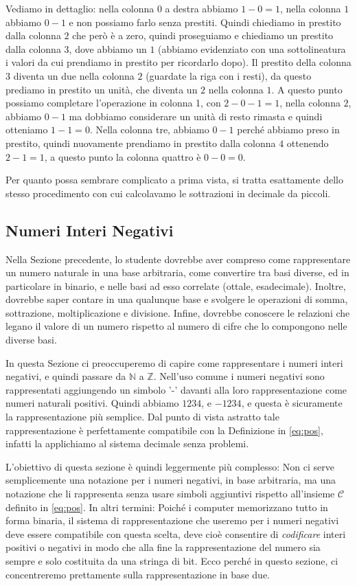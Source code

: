 \documentclass[a4paper]{book}
\theoremstyle{definition}
\begin{document}
Vediamo in dettaglio: nella colonna $0$ a destra abbiamo $1-0 = 1$,
nella colonna $1$ abbiamo $0-1$ e non possiamo farlo senza prestiti. 
Quindi chiediamo in prestito dalla colonna $2$ che però è a zero, quindi proseguiamo e chiediamo un prestito dalla colonna $3$, dove abbiamo un $1$ (abbiamo evidenziato con una sottolineatura i valori da cui prendiamo in prestito per ricordarlo dopo).
Il prestito della colonna $3$ diventa un due nella colonna $2$ (guardate la riga con i resti), da questo prediamo in prestito un unità, che diventa un $2$ nella colonna $1$.
A questo punto possiamo completare l'operazione in colonna 1, con $2-0-1 = 1$,
nella colonna $2$, abbiamo $0 - 1$ ma dobbiamo considerare un unità di resto rimasta e quindi otteniamo $1 - 1 = 0$. Nella colonna tre, abbiamo $0-1$ perché abbiamo preso in prestito, quindi nuovamente prendiamo in prestito dalla colonna $4$ ottenendo $2-1 = 1$, a questo punto la colonna quattro è $0-0=0$.

Per quanto possa sembrare complicato a prima vista, si tratta esattamente
dello stesso procedimento con cui calcolavamo le sottrazioni in decimale da piccoli.


\subsection{Numeri Interi Negativi}

Nella Sezione precedente, lo studente dovrebbe aver compreso come rappresentare
un numero naturale in una base arbitraria, come convertire tra basi diverse, ed
in particolare in binario, e nelle basi ad esso correlate (ottale,
esadecimale). Inoltre, dovrebbe saper contare in una qualunque base e svolgere
le operazioni di somma, sottrazione, moltiplicazione e divisione. Infine,
dovrebbe conoscere le relazioni che legano il valore di un numero rispetto al
numero di cifre che lo compongono nelle diverse basi.

In questa Sezione ci preoccuperemo di capire come rappresentare i numeri interi negativi, e quindi passare da $\mathbb{N}$ a $\mathbb{Z}$. Nell'uso comune i numeri negativi sono rappresentati aggiungendo un simbolo '-' davanti alla loro rappresentazione come numeri naturali positivi. Quindi abbiamo $1234$, e $-1234$, e questa è sicuramente la rappresentazione più semplice. Dal punto di vista astratto tale rappresentazione è perfettamente compatibile con la Definizione in \eqref{eq:pos}, infatti la applichiamo al sistema decimale senza problemi.

L'obiettivo di questa sezione è quindi leggermente più complesso: Non ci serve semplicemente una notazione per i numeri negativi, in base arbitraria, ma una notazione che li rappresenta senza usare simboli aggiuntivi rispetto all'insieme $\mathcal{C}$ definito in \eqref{eq:pos}. In altri termini: Poiché i computer memorizzano tutto in forma binaria, il sistema di rappresentazione che useremo per i numeri negativi deve essere compatibile con questa scelta, deve cioè consentire di \emph{codificare} interi positivi o negativi in modo che alla fine la rappresentazione del numero sia sempre e solo costituita da una stringa di bit. Ecco perché in questo sezione, ci concentreremo prettamente sulla rappresentazione in base due.
\end{document}
